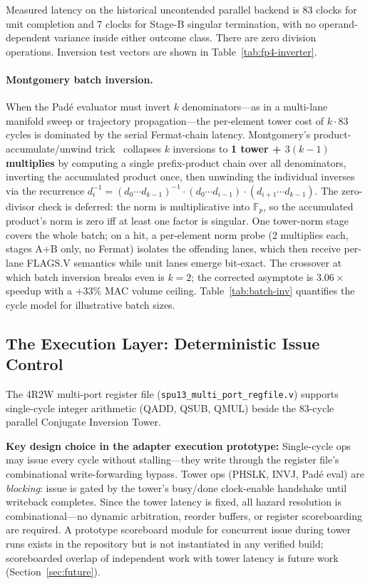 \documentclass[conference]{IEEEtran}
\begin{document}
Measured latency on the historical uncontended parallel backend is 83 clocks
for unit completion and 7 clocks for Stage-B singular termination, with no
operand-dependent variance inside either outcome class. There are zero
division operations. Inversion test vectors are shown in
Table~\ref{tab:fp4-inverter}.

\paragraph{Montgomery batch inversion.}
When the Pad\'{e} evaluator must invert $k$ denominators---as in a
multi-lane manifold sweep or trajectory propagation---the per-element
tower cost of $k \cdot 83$ cycles is dominated by the serial Fermat-chain
latency. Montgomery's product-accumulate/unwind trick~\cite{montgomery1987}
collapses $k$ inversions to \textbf{1 tower + $3(k-1)$ multiplies} by
computing a single prefix-product chain over all denominators, inverting
the accumulated product once, then unwinding the individual inverses via
the recurrence $d_i^{-1} = (d_0\cdots d_{k-1})^{-1} \cdot (d_0\cdots
d_{i-1}) \cdot (d_{i+1}\cdots d_{k-1})$. The zero-divisor check is
deferred: the norm is multiplicative into $\mathbb{F}_p$, so the
accumulated product's norm is zero iff at least one factor is singular.
One tower-norm stage covers the whole batch; on a hit, a per-element norm
probe ($2$ multiplies each, stages A+B only, no Fermat) isolates the
offending lanes, which then receive per-lane FLAGS.V semantics while
unit lanes emerge bit-exact. The crossover at which batch inversion
breaks even is $k = 2$; the corrected asymptote is $3.06\times$ speedup with a
$+33\%$ MAC volume ceiling. Table~\ref{tab:batch-inv} quantifies the
cycle model for illustrative batch sizes.

\subsection{The Execution Layer: Deterministic Issue Control}

The 4R2W multi-port register file (\texttt{spu13\_multi\_port\_regfile.v})
supports single-cycle integer arithmetic (QADD, QSUB, QMUL) beside the
83-cycle parallel Conjugate Inversion Tower.

\textbf{Key design choice in the adapter execution prototype:} Single-cycle ops may issue every cycle without
stalling---they write through the register file's combinational
write-forwarding bypass. Tower ops (PHSLK, INVJ, Pad\'{e} eval) are
\emph{blocking}: issue is gated by the tower's busy/done clock-enable
handshake until writeback completes. Since the tower latency is fixed,
all hazard resolution is combinational---no dynamic arbitration, reorder
buffers, or register scoreboarding are required. A prototype scoreboard
module for concurrent issue during tower runs exists in the repository
but is not instantiated in any verified build; scoreboarded overlap of
independent work with tower latency is future work
(Section~\ref{sec:future}).
\end{document}
